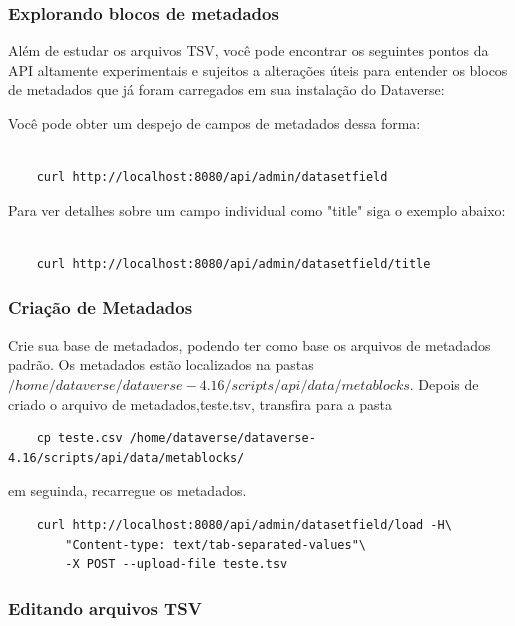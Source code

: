 \documentclass[12pt,hidelinks]{article}
\begin{document}
\subsubsection{Explorando blocos de metadados}

\qquad Além de estudar os arquivos TSV, você pode encontrar os seguintes pontos da API altamente experimentais e sujeitos a alterações úteis para entender os blocos de metadados que já foram carregados em sua instalação do Dataverse:

Você pode obter um despejo de campos de metadados dessa forma:

\begin{verbatim}

    curl http://localhost:8080/api/admin/datasetfield

\end{verbatim}

Para ver detalhes sobre um campo individual como "title" siga o exemplo abaixo:

\begin{verbatim}

    curl http://localhost:8080/api/admin/datasetfield/title

\end{verbatim}

\subsubsection{Criação de Metadados}
        
        \qquad Crie sua base de metadados, podendo ter como base os arquivos de metadados padrão. Os metadados estão localizados na pastas $/home/dataverse/dataverse-4.16/scripts/api/data/metablocks$. Depois de criado o arquivo de metadados,teste.tsv, transfira para a pasta
        
        \begin{verbatim}
    cp teste.csv /home/dataverse/dataverse-4.16/scripts/api/data/metablocks/
        \end{verbatim}
        em seguinda, recarregue os metadados.
        \begin{verbatim}
    curl http://localhost:8080/api/admin/datasetfield/load -H\
        "Content-type: text/tab-separated-values"\ 
        -X POST --upload-file teste.tsv
        \end{verbatim}

\subsubsection{Editando arquivos TSV}
\end{document}
